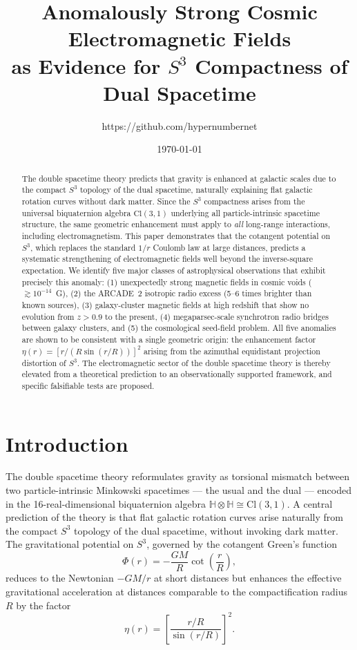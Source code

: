 \documentclass[a4paper]{article}
\title{Anomalously Strong Cosmic Electromagnetic Fields\\
as Evidence for $S^3$ Compactness of Dual Spacetime}
\author{https://github.com/hypernumbernet}
\date{\today}
\begin{document}
\maketitle

\begin{abstract}
The double spacetime theory predicts that gravity is enhanced at galactic scales
due to the compact $S^3$ topology of the dual spacetime, naturally explaining
flat galactic rotation curves without dark matter. Since the $S^3$ compactness
arises from the universal biquaternion algebra $\mathrm{Cl}(3,1)$ underlying
all particle-intrinsic spacetime structure, the same geometric enhancement must
apply to \emph{all} long-range interactions, including electromagnetism. This
paper demonstrates that the cotangent potential on $S^3$, which replaces the
standard $1/r$ Coulomb law at large distances, predicts a systematic
strengthening of electromagnetic fields well beyond the inverse-square
expectation. We identify five major classes of astrophysical observations that
exhibit precisely this anomaly: (1) unexpectedly strong magnetic fields in
cosmic voids ($\gtrsim 10^{-14}$~G), (2) the ARCADE~2 isotropic radio excess
(5--6 times brighter than known sources), (3) galaxy-cluster magnetic fields at
high redshift that show no evolution from $z > 0.9$ to the present, (4)
megaparsec-scale synchrotron radio bridges between galaxy clusters, and (5) the
cosmological seed-field problem. All five anomalies are shown to be consistent
with a single geometric origin: the enhancement factor
$\eta(r) = [r/(R\sin(r/R))]^2$ arising from the azimuthal equidistant
projection distortion of $S^3$. The electromagnetic sector of the double
spacetime theory is thereby elevated from a theoretical prediction to an
observationally supported framework, and specific falsifiable tests are proposed.
\end{abstract}

\section{Introduction}
\label{sec:introduction}

The double spacetime theory \cite{dst-main} reformulates gravity as torsional
mismatch between two particle-intrinsic Minkowski spacetimes --- the usual and
the dual --- encoded in the 16-real-dimensional biquaternion algebra
$\mathbb{H} \otimes \mathbb{H} \cong \mathrm{Cl}(3,1)$. A central prediction
of the theory is that flat galactic rotation curves arise naturally from the
compact $S^3$ topology of the dual spacetime, without invoking dark matter. The
gravitational potential on $S^3$, governed by the cotangent Green's function
\[
\Phi(r) = -\frac{GM}{R}\cot\!\left(\frac{r}{R}\right),
\]
reduces to the Newtonian $-GM/r$ at short distances but enhances the effective
gravitational acceleration at distances comparable to the compactification
radius $R$ by the factor
\[
\eta(r) = \left[\frac{r/R}{\sin(r/R)}\right]^2.
\]
\end{document}
